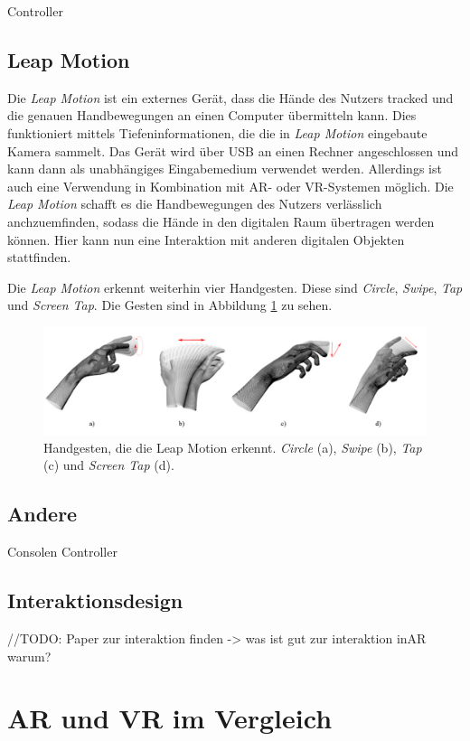 Controller
\subsection{Leap Motion}

Die \textit{Leap Motion} ist ein externes Gerät, dass die Hände des Nutzers tracked und die genauen Handbewegungen an einen Computer übermitteln kann. 
Dies funktioniert mittels Tiefeninformationen, die die in \textit{Leap Motion} eingebaute Kamera sammelt. Das Gerät wird über USB an einen Rechner angeschlossen und kann dann als unabhängiges Eingabemedium verwendet werden. Allerdings ist auch eine Verwendung in Kombination mit AR- oder VR-Systemen möglich. 
Die \textit{Leap Motion} schafft es die Handbewegungen des Nutzers verlässlich anchzuemfinden, sodass die Hände in den digitalen Raum übertragen werden können. Hier kann nun eine Interaktion mit anderen digitalen Objekten stattfinden. 

Die \textit{Leap Motion} erkennt weiterhin vier Handgesten. Diese sind \textit{Circle}, \textit{Swipe}, \textit{Tap} und \textit{Screen Tap}. Die Gesten sind in Abbildung \ref{img:motionGestures} zu sehen. 

\begin{figure}
	\centering
	\includegraphics[width=0.7\linewidth]{images/motionGesture.pdf}
	\caption{Handgesten, die die Leap Motion erkennt. \textit{Circle} (a), \textit{Swipe} (b), \textit{Tap} (c) und \textit{Screen Tap} (d).}
	\label{img:motionGestures}
\end{figure}


\subsection{Andere}
Consolen Controller
\subsection{Interaktionsdesign}

//TODO:
Paper zur interaktion finden
-> was ist gut zur interaktion inAR warum?

\section{AR und VR im Vergleich}

